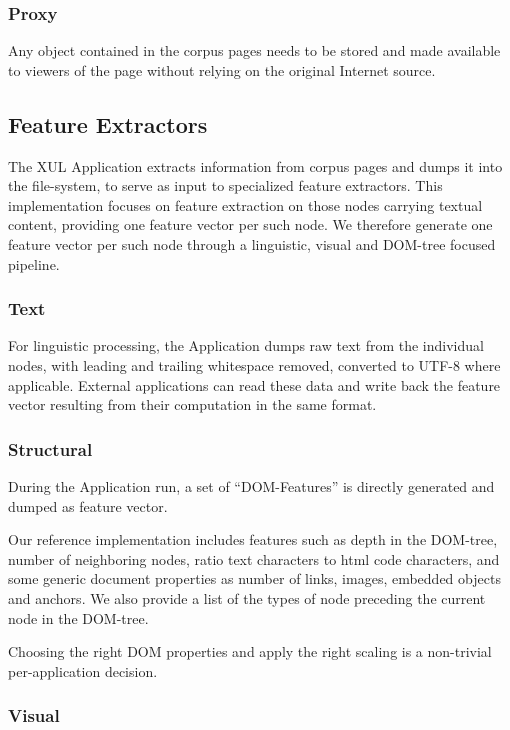 \subsubsection{Proxy}

Any object contained in the corpus pages needs to be stored and made available to viewers of the page without relying on the original Internet source.

\subsection{Feature Extractors}

The XUL Application extracts information from corpus pages and dumps it into the file-system, to serve as input to specialized feature extractors.
This implementation focuses on feature extraction on those nodes carrying textual content, providing one feature vector per such node.
We therefore generate one feature vector per such node through a linguistic, visual and DOM-tree focused pipeline.

\subsubsection{Text}

For linguistic processing, the Application dumps raw text from the individual nodes, with leading and trailing whitespace removed, converted to UTF-8 where applicable.
External applications can read these data and write back the feature vector resulting from their computation in the same format.

\subsubsection{Structural}

During the Application run, a set of ``DOM-Features'' is directly generated and dumped as feature vector.

Our reference implementation includes features such as depth in the DOM-tree, number of neighboring nodes, ratio text characters to html code characters,
  and some generic document properties as number of links, images, embedded objects and anchors.
We also provide a list of the types of node preceding the current node in the DOM-tree.

Choosing the right DOM properties and apply the right scaling is a non-trivial per-application decision.

\subsubsection{Visual}

